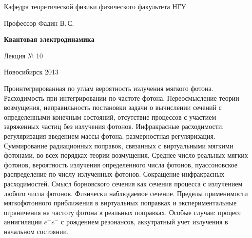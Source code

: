 \documentclass[12pt,pagesize,paper=landscape,paper=192mm:108mm]{scrbook}
\begin{document}
\begin{titlepage}
\begin{center}
    Кафедра теоретической физики физического факультета НГУ
    \medskip

    \Large
    Профессор Фадин В.\,С.
    \bigskip

    \huge
    \textbf{Квантовая электродинамика}
    \bigskip

    \Large
    Лекция № 10
    \vfill

    \normalsize
    \vfill

    \normalsize \ccbysa\hspace{0.5em}  Новосибирск 2013
  \end{center}
\end{titlepage}
\vspace*{-1em}
\begin{center}
\vfill
  \begin{minipage}{0.8\linewidth}
    Проинтегрированная по углам вероятность излучения мягкого
    фотона. Расходимость при интегрировании по частоте
    фотона. Переосмысление теории возмущения, неправильность
    постановки задачи о вычислении сечений с определенными конечным
    состояний, отсутствие процессов с участием заряженных частиц без
    излучения фотонов. Инфракрасные расходимости, регуляризация
    введением массы фотона, размерностная регуляризация.  Суммирование
    радиационных поправок, связанных с виртуальными мягкими фотонами,
    во всех порядках теории возмущения. Среднее число реальных мягких
    фотонов, вероятность излучения определенного числа фотонов,
    пуассоновское распределение по числу излученных
    фотонов. Сокращение инфракрасных расходимостей. Смысл борновского
    сечения как сечения процесса с излучением любого числа
    фотонов. Физически наблюдаемое сечение. Пределы применимости
    мягкофотонного приближения в виртуальных поправках и
    экспериментальные ограничения на частоту фотона в реальных
    поправках. Особые случаи: процесс аннигиляции $e^+e^-$ с рождением
    резонансов, аккутратный учет излучения в начальном состоянии.
  \end{minipage}
  \vfill

\end{center}
\end{document}
